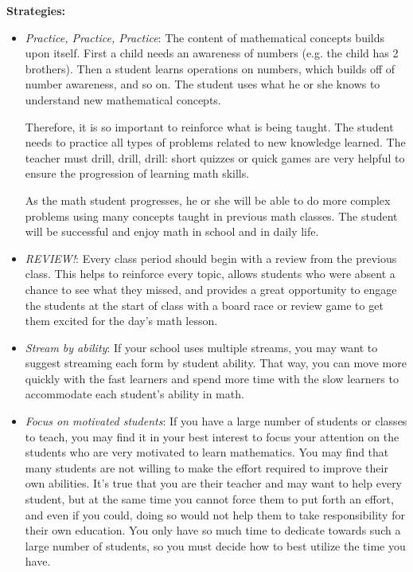 \textbf{Strategies:}
\begin{itemize}
\item\emph{Practice, Practice, Practice}: The content of mathematical concepts builds upon itself. First a child needs an awareness of numbers (e.g. the child has 2 brothers). Then a student learns operations on numbers, which builds off of number awareness, and so on. The student uses what he or she knows to understand new mathematical concepts.

Therefore, it is so important to reinforce what is being taught. The student needs to practice all types of problems related to new knowledge learned. The teacher must drill, drill, drill: short quizzes or quick games are very helpful to ensure the progression of learning math skills.

As the math student progresses, he or she will be able to do more complex problems using many concepts taught in previous math classes. The student will be successful and enjoy math in school and in daily life.

\item\emph{REVIEW!}: Every class period should begin with a review from the previous class. This helps to reinforce every topic, allows students who were absent a chance to see what they missed, and provides a great opportunity to engage the students at the start of class with a board race or review game to get them excited for the day's math lesson.

\item\emph{Stream by ability}: If your school uses multiple streams, you may want to suggest streaming each form by student ability. That way, you can move more quickly with the fast learners and spend more time with the slow learners to accommodate each student's ability in math.

\item\emph{Focus on motivated students}: If you have a large number of students or classes to teach, you may find it in your best interest to focus your attention on the students who are very motivated to learn mathematics. You may find that many students are not willing to make the effort required to improve their own abilities. It's true that you are their teacher and may want to help every student, but at the same time you cannot force them to put forth an effort, and even if you could, doing so would not help them to take responsibility for their own education. You only have so much time to dedicate towards such a large number of students, so you must decide how to best utilize the time you have. 
\end{itemize}

